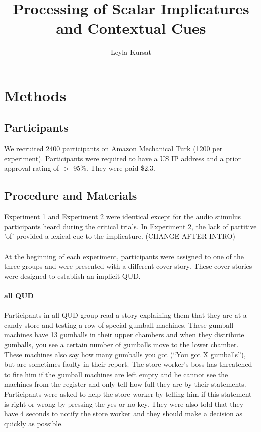 \documentclass[12pt]{article}
\title{Processing of Scalar Implicatures and Contextual Cues}
\author{Leyla Kursat}
\begin{document}
 
\maketitle 

\section{Methods}
\subsection*{Participants}
We recruited 2400 participants on Amazon Mechanical Turk (1200 per experiment). Participants were required to have a US IP address and a prior approval rating of $>$ 95\%. They were paid \$2.3.

\subsection*{Procedure and Materials}
Experiment 1 and Experiment 2 were identical except for the audio stimulus participants heard during the critical trials. In Experiment 2, the lack of partitive 'of' provided a lexical cue to the implicature. (CHANGE AFTER INTRO)

\paragraph{} At the beginning of each experiment, participants were assigned to one of the three groups and were presented with a different cover story. These cover stories were designed to establish an implicit QUD.

\paragraph{all QUD} Participants in all QUD group read a story explaining them that they are at a candy store and testing a row of special gumball machines. These gumball machines have 13 gumballs in their upper chambers and when they distribute gumballs, you see a certain number of gumballs move to the lower chamber. These machines also say how many gumballs you got (“You got X gumballs”), but are sometimes faulty in their report. The store worker’s boss has threatened to fire him if the gumball machines are left empty and he cannot see the machines from the register and only tell how full they are by their statements. Participants were asked to help the store worker by telling him if this statement is right or wrong by pressing the yes or no key. They were also told that they have 4 seconds to notify the store worker and they should make a decision as quickly as possible.
\end{document}
